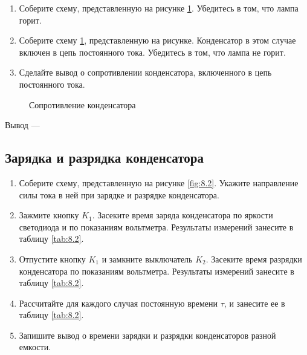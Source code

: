 \begin{enumerate}
	\item Соберите схему, представленную на рисунке \ref{ris:8.1}.  Убедитесь в том, что лампа горит. 
	\item Соберите схему \ref{ris:8.1}, представленную на рисунке. Конденсатор в этом случае включен в цепь постоянного тока. Убедитесь в том, что лампа не горит. 
	\item Сделайте вывод о сопротивлении конденсатора, включенного в цепь постоянного тока.
\end{enumerate}

\begin{figure}[h]
\begin{minipage}[h]{0.5\linewidth}
\end{minipage}
\hfill
\begin{minipage}[h]{0.5\linewidth}
\end{minipage}
\caption{Сопротивление конденсатора}
\label{ris:8.1}
\end{figure}

Вывод --- \hrulefill

\hrulefill

\hrulefill


\subsection{Зарядка и разрядка конденсатора}

\begin{enumerate}
	\item Соберите схему, представленную на рисунке \ref{fig:8.2}. Укажите направление силы тока в ней при зарядке и разрядке конденсатора.
	\item Зажмите кнопку $K_1$. Засеките время заряда конденсатора по яркости светодиода и по показаниям вольтметра. Результаты измерений занесите в таблицу \ref{tab:8.2}. 
	\item Отпустите кнопку $K_1$ и замкните выключатель $K_2$. Засеките время разрядки конденсатора по показаниям вольтметра. Результаты измерений занесите в таблицу \ref{tab:8.2}.
	\item Рассчитайте для каждого случая постоянную времени $\tau$, и занесите ее в таблицу \ref{tab:8.2}.
	\item Запишите вывод о времени зарядки и разрядки конденсаторов разной емкости. 
\end{enumerate}

